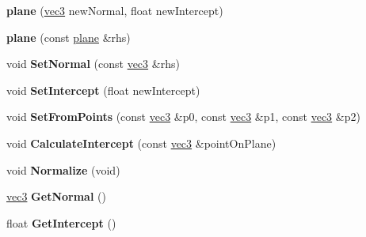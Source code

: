 \begin{DoxyCompactItemize}
\item 
\hypertarget{classmath_1_1plane_afebf782c7828f4f6c53462b0a9b18b1e}{
{\bfseries plane} (\hyperlink{classmath_1_1vec3}{vec3} newNormal, float newIntercept)}
\label{classmath_1_1plane_afebf782c7828f4f6c53462b0a9b18b1e}

\item 
\hypertarget{classmath_1_1plane_a25c3bf9902eaff31c6b5bbf9a1b3322a}{
{\bfseries plane} (const \hyperlink{classmath_1_1plane}{plane} \&rhs)}
\label{classmath_1_1plane_a25c3bf9902eaff31c6b5bbf9a1b3322a}

\item 
\hypertarget{classmath_1_1plane_a9fe8b3594923c703c1ab5c644a7fba60}{
void {\bfseries SetNormal} (const \hyperlink{classmath_1_1vec3}{vec3} \&rhs)}
\label{classmath_1_1plane_a9fe8b3594923c703c1ab5c644a7fba60}

\item 
\hypertarget{classmath_1_1plane_a7ed123f20808367fbeda9e75eaaa6766}{
void {\bfseries SetIntercept} (float newIntercept)}
\label{classmath_1_1plane_a7ed123f20808367fbeda9e75eaaa6766}

\item 
\hypertarget{classmath_1_1plane_a39bd4a07bf6b7b4583d522ff11f873d0}{
void {\bfseries SetFromPoints} (const \hyperlink{classmath_1_1vec3}{vec3} \&p0, const \hyperlink{classmath_1_1vec3}{vec3} \&p1, const \hyperlink{classmath_1_1vec3}{vec3} \&p2)}
\label{classmath_1_1plane_a39bd4a07bf6b7b4583d522ff11f873d0}

\item 
\hypertarget{classmath_1_1plane_ae4275e2af7ccdacaf4a3e0831ea009cc}{
void {\bfseries CalculateIntercept} (const \hyperlink{classmath_1_1vec3}{vec3} \&pointOnPlane)}
\label{classmath_1_1plane_ae4275e2af7ccdacaf4a3e0831ea009cc}

\item 
\hypertarget{classmath_1_1plane_afea36d03496c252a22b98506d33117df}{
void {\bfseries Normalize} (void)}
\label{classmath_1_1plane_afea36d03496c252a22b98506d33117df}

\item 
\hypertarget{classmath_1_1plane_a21aeb399211c8e50a391ce70bb71a113}{
\hyperlink{classmath_1_1vec3}{vec3} {\bfseries GetNormal} ()}
\label{classmath_1_1plane_a21aeb399211c8e50a391ce70bb71a113}

\item 
\hypertarget{classmath_1_1plane_ac8127f9e5b508ba2c51a3422122c2511}{
float {\bfseries GetIntercept} ()}
\label{classmath_1_1plane_ac8127f9e5b508ba2c51a3422122c2511}


\end{DoxyCompactItemize}
